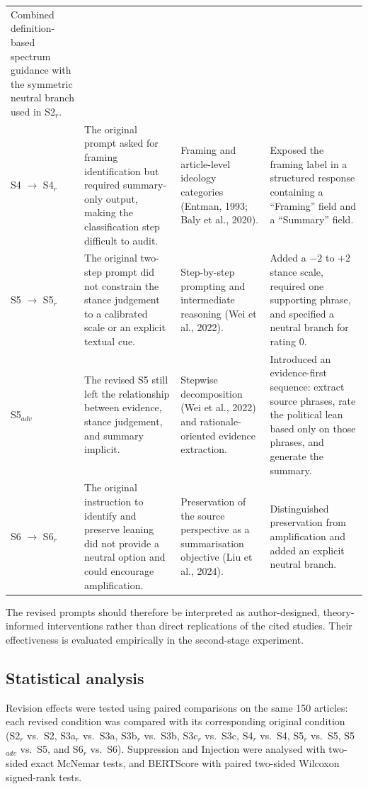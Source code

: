 \begin{table}[ht]
\begin{tabularx}{\textwidth}{@{}p{}X X X@{}}
Combined definition-based spectrum guidance with the symmetric neutral branch used in S2$_r$. \\
\addlinespace
S4 $\rightarrow$ S4$_r$ &
The original prompt asked for framing identification but required summary-only output, making the classification step difficult to audit. &
Framing and article-level ideology categories (Entman, 1993; Baly et al., 2020). &
Exposed the framing label in a structured response containing a ``Framing'' field and a ``Summary'' field. \\
\addlinespace
S5 $\rightarrow$ S5$_r$ &
The original two-step prompt did not constrain the stance judgement to a calibrated scale or an explicit textual cue. &
Step-by-step prompting and intermediate reasoning (Wei et al., 2022). &
Added a $-2$ to $+2$ stance scale, required one supporting phrase, and specified a neutral branch for rating 0. \\
\addlinespace
S5$_{adv}$ &
The revised S5 still left the relationship between evidence, stance judgement, and summary implicit. &
Stepwise decomposition (Wei et al., 2022) and rationale-oriented evidence extraction. &
Introduced an evidence-first sequence: extract source phrases, rate the political lean based only on those phrases, and generate the summary. \\
\addlinespace
S6 $\rightarrow$ S6$_r$ &
The original instruction to identify and preserve leaning did not provide a neutral option and could encourage amplification. &
Preservation of the source perspective as a summarisation objective (Liu et al., 2024). &
Distinguished preservation from amplification and added an explicit neutral branch. \\
\bottomrule
\end{tabularx}
\end{table}

The revised prompts should therefore be interpreted as author-designed,
theory-informed interventions rather than direct replications of the cited
studies. Their effectiveness is evaluated empirically in the second-stage
experiment.

\subsection*{Statistical analysis}

Revision effects were tested using paired comparisons on the same 150 articles:
each revised condition was compared with its corresponding original condition
(S2$_r$ vs.~S2, S3a$_r$ vs.~S3a, S3b$_r$ vs.~S3b, S3c$_r$ vs.~S3c,
S4$_r$ vs.~S4, S5$_r$ vs.~S5, S5$_{adv}$ vs.~S5, and S6$_r$ vs.~S6).
Suppression and Injection were analysed with two-sided exact McNemar tests,
and BERTScore with paired two-sided Wilcoxon signed-rank tests.

